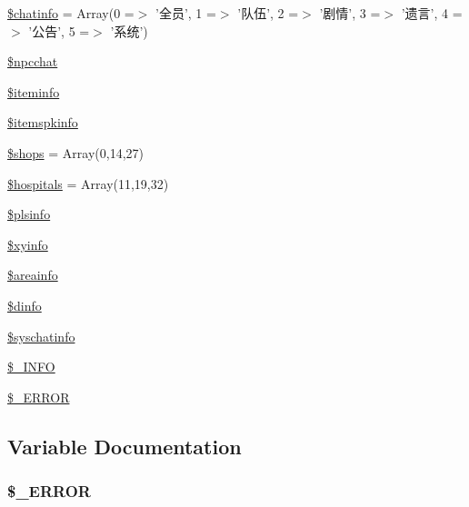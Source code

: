 \begin{DoxyCompactItemize}
\item 
\hyperlink{cache_2resources__1_8php_abcea2ccdba90758edbd052712f3b2cec}{\$chatinfo} = Array(0 =$>$ '全员', 1 =$>$ '队伍', 2 =$>$ '剧情', 3 =$>$ '遗言', 4 =$>$ '公告', 5 =$>$ '系统')
\item 
\hyperlink{cache_2resources__1_8php_a413262abf345c0466e9927a412571365}{\$npcchat}
\item 
\hyperlink{cache_2resources__1_8php_abf61f517048be2c7cc3d9c24e62f1160}{\$iteminfo}
\item 
\hyperlink{cache_2resources__1_8php_af5da654ca4941efa7e59e9608ad80106}{\$itemspkinfo}
\item 
\hyperlink{cache_2resources__1_8php_a6a4f6f4fa7edf238e168beb18f0870af}{\$shops} = Array(0,14,27)
\item 
\hyperlink{cache_2resources__1_8php_a522f774b7af7274c8142c2bf00854709}{\$hospitals} = Array(11,19,32)
\item 
\hyperlink{cache_2resources__1_8php_a80fc03ebf0cae6b56b4e8f4738273199}{\$plsinfo}
\item 
\hyperlink{cache_2resources__1_8php_aabc8b00fb3b56eab2f2d6ff8e1f0839c}{\$xyinfo}
\item 
\hyperlink{cache_2resources__1_8php_aabf13bd9fe14d8a463c5f4b334361291}{\$areainfo}
\item 
\hyperlink{cache_2resources__1_8php_a9640d994c06710b77fc93ddf4f99f50f}{\$dinfo}
\item 
\hyperlink{cache_2resources__1_8php_ac8bce71e872b69086880bde6d22e8a8c}{\$syschatinfo}
\item 
\hyperlink{cache_2resources__1_8php_acc171a42cb2c06ea14b041fc55b5cc24}{\$\+\_\+\+I\+N\+F\+O}
\item 
\hyperlink{cache_2resources__1_8php_a07754cf9f14d6271b746015934a7753e}{\$\+\_\+\+E\+R\+R\+O\+R}
\end{DoxyCompactItemize}


\subsection{Variable Documentation}
\hypertarget{cache_2resources__1_8php_a07754cf9f14d6271b746015934a7753e}{
\subsubsection[{\$\+\_\+\+E\+R\+R\+O\+R}]{\setlength{\rightskip}{0pt plus 5cm}\$\+\_\+\+E\+R\+R\+O\+R}}\label{cache_2resources__1_8php_a07754cf9f14d6271b746015934a7753e}


